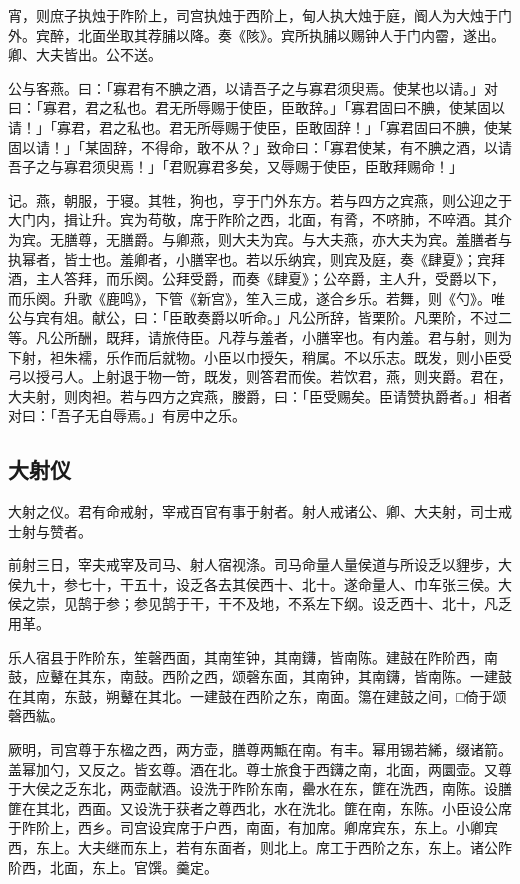 \documentclass[]{article}
\begin{document}
宵，则庶子执烛于阼阶上，司宫执烛于西阶上，甸人执大烛于庭，阍人为大烛于门外。宾醉，北面坐取其荐脯以降。奏《陔》。宾所执脯以赐钟人于门内霤，遂出。卿、大夫皆出。公不送。

公与客燕。曰：「寡君有不腆之酒，以请吾子之与寡君须臾焉。使某也以请。」对曰：「寡君，君之私也。君无所辱赐于使臣，臣敢辞。」「寡君固曰不腆，使某固以请！」「寡君，君之私也。君无所辱赐于使臣，臣敢固辞！」「寡君固曰不腆，使某固以请！」「某固辞，不得命，敢不从？」致命曰：「寡君使某，有不腆之酒，以请吾子之与寡君须臾焉！」「君贶寡君多矣，又辱赐于使臣，臣敢拜赐命！」

记。燕，朝服，于寝。其牲，狗也，亨于门外东方。若与四方之宾燕，则公迎之于大门内，揖让升。宾为苟敬，席于阼阶之西，北面，有脀，不哜肺，不啐酒。其介为宾。无膳尊，无膳爵。与卿燕，则大夫为宾。与大夫燕，亦大夫为宾。羞膳者与执幂者，皆士也。羞卿者，小膳宰也。若以乐纳宾，则宾及庭，奏《肆夏》；宾拜酒，主人答拜，而乐阕。公拜受爵，而奏《肆夏》；公卒爵，主人升，受爵以下，而乐阕。升歌《鹿鸣》，下管《新宫》，笙入三成，遂合乡乐。若舞，则《勺》。唯公与宾有俎。献公，曰：「臣敢奏爵以听命。」凡公所辞，皆栗阶。凡栗阶，不过二等。凡公所酬，既拜，请旅侍臣。凡荐与羞者，小膳宰也。有内羞。君与射，则为下射，袒朱襦，乐作而后就物。小臣以巾授矢，稍属。不以乐志。既发，则小臣受弓以授弓人。上射退于物一笴，既发，则答君而俟。若饮君，燕，则夹爵。君在，大夫射，则肉袒。若与四方之宾燕，媵爵，曰：「臣受赐矣。臣请赞执爵者。」相者对曰：「吾子无自辱焉。」有房中之乐。

\hypertarget{header-n36}{%
\subsection{大射仪}\label{header-n36}}

大射之仪。君有命戒射，宰戒百官有事于射者。射人戒诸公、卿、大夫射，司士戒士射与赞者。

前射三日，宰夫戒宰及司马、射人宿视涤。司马命量人量侯道与所设乏以貍步，大侯九十，参七十，干五十，设乏各去其侯西十、北十。遂命量人、巾车张三侯。大侯之崇，见鹄于参；参见鹄于干，干不及地，不系左下纲。设乏西十、北十，凡乏用革。

乐人宿县于阼阶东，笙磬西面，其南笙钟，其南鑮，皆南陈。建鼓在阼阶西，南鼓，应鼙在其东，南鼓。西阶之西，颂磬东面，其南钟，其南鑮，皆南陈。一建鼓在其南，东鼓，朔鼙在其北。一建鼓在西阶之东，南面。簜在建鼓之间，□倚于颂磬西紘。

厥明，司宫尊于东楹之西，两方壶，膳尊两甒在南。有丰。幂用锡若絺，缀诸箭。盖幂加勺，又反之。皆玄尊。酒在北。尊士旅食于西鑮之南，北面，两圜壶。又尊于大侯之乏东北，两壶献酒。设洗于阼阶东南，罍水在东，篚在洗西，南陈。设膳篚在其北，西面。又设洗于获者之尊西北，水在洗北。篚在南，东陈。小臣设公席于阼阶上，西乡。司宫设宾席于户西，南面，有加席。卿席宾东，东上。小卿宾西，东上。大夫继而东上，若有东面者，则北上。席工于西阶之东，东上。诸公阼阶西，北面，东上。官馔。羹定。
\end{document}
